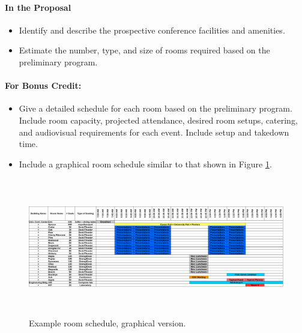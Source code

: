\documentclass[12pt]{article}
\begin{document}
\paragraph{In the Proposal}
\begin{itemize}
\item{Identify and describe the prospective conference facilities and amenities.}
\item{Estimate the number, type, and size of rooms required based on the preliminary
program.}
\end{itemize}

\paragraph{For Bonus Credit:}
\begin{itemize}
\item{Give a detailed schedule for each room based on the preliminary program.
Include room capacity, projected attendance, desired room setups, catering, and
audiovisual requirements for each event. Include setup and takedown time.}
\item{Include a graphical room schedule similar to that shown in Figure \ref{fig:example_room_schedule_1}.}
\end{itemize}

\begin{figure}[h]
\centering
\includegraphics[width=18cm, height=6cm]{example_room_schedule.png}
\caption{Example room schedule, graphical version.}
\label{fig:example_room_schedule_1}
\end{figure}

\clearpage

\end{document}
